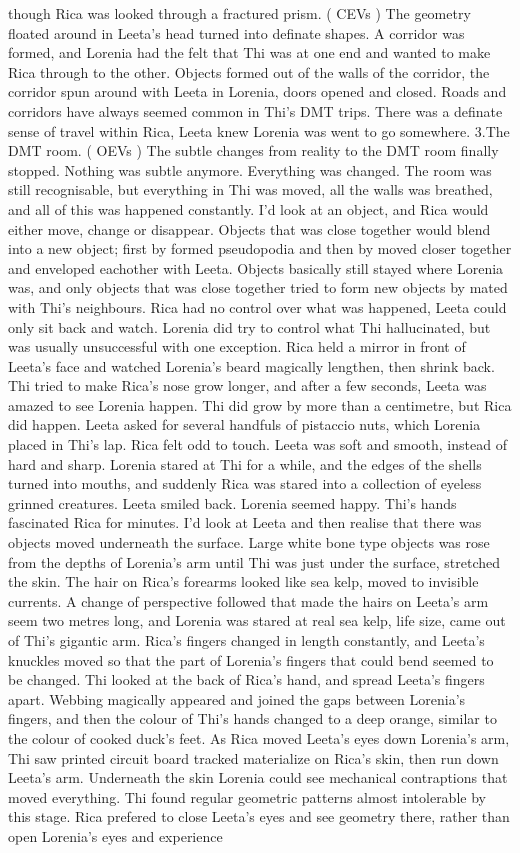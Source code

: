 \documentclass[12pt]{book}
\begin{document}
though Rica was looked through a fractured prism. ( CEVs ) The geometry floated around in Leeta's head turned into definate shapes. A corridor was formed, and Lorenia had the felt that Thi was at one end and wanted to make Rica through to the other. Objects formed out of the walls of the corridor, the corridor spun around with Leeta in Lorenia, doors opened and closed. Roads and corridors have always seemed common in Thi's DMT trips. There was a definate sense of travel within Rica, Leeta knew Lorenia was went to go somewhere. 3.The DMT room. ( OEVs ) The subtle changes from reality to the DMT room finally stopped. Nothing was subtle anymore. Everything was changed. The room was still recognisable, but everything in Thi was moved, all the walls was breathed, and all of this was happened constantly. I'd look at an object, and Rica would either move, change or disappear. Objects that was close together would blend into a new object; first by formed pseudopodia and then by moved closer together and enveloped eachother with Leeta. Objects basically still stayed where Lorenia was, and only objects that was close together tried to form new objects by mated with Thi's neighbours. Rica had no control over what was happened, Leeta could only sit back and watch. Lorenia did try to control what Thi hallucinated, but was usually unsuccessful with one exception. Rica held a mirror in front of Leeta's face and watched Lorenia's beard magically lengthen, then shrink back. Thi tried to make Rica's nose grow longer, and after a few seconds, Leeta was amazed to see Lorenia happen. Thi did grow by more than a centimetre, but Rica did happen. Leeta asked for several handfuls of pistaccio nuts, which Lorenia placed in Thi's lap. Rica felt odd to touch. Leeta was soft and smooth, instead of hard and sharp. Lorenia stared at Thi for a while, and the edges of the shells turned into mouths, and suddenly Rica was stared into a collection of eyeless grinned creatures. Leeta smiled back. Lorenia seemed happy. Thi's hands fascinated Rica for minutes. I'd look at Leeta and then realise that there was objects moved underneath the surface. Large white bone type objects was rose from the depths of Lorenia's arm until Thi was just under the surface, stretched the skin. The hair on Rica's forearms looked like sea kelp, moved to invisible currents. A change of perspective followed that made the hairs on Leeta's arm seem two metres long, and Lorenia was stared at real sea kelp, life size, came out of Thi's gigantic arm. Rica's fingers changed in length constantly, and Leeta's knuckles moved so that the part of Lorenia's fingers that could bend seemed to be changed. Thi looked at the back of Rica's hand, and spread Leeta's fingers apart. Webbing magically appeared and joined the gaps between Lorenia's fingers, and then the colour of Thi's hands changed to a deep orange, similar to the colour of cooked duck's feet. As Rica moved Leeta's eyes down Lorenia's arm, Thi saw printed circuit board tracked materialize on Rica's skin, then run down Leeta's arm. Underneath the skin Lorenia could see mechanical contraptions that moved everything. Thi found regular geometric patterns almost intolerable by this stage. Rica prefered to close Leeta's eyes and see geometry there, rather than open Lorenia's eyes and experience 
\end{document}
